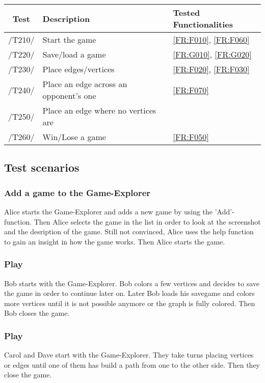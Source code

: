 \begin{tabular}{cll}

\hline
\textbf{Test} & \textbf{Description} & \textbf{Tested Functionalities} \\
\hline
/T210/ & Start the game & \ref{FR:F010}, \ref{FR:F060} \\
/T220/ & Save/load a game & \ref{FR:G010}, \ref{FR:G020} \\
/T230/ & Place edges/vertices & \ref{FR:F020}, \ref{FR:F030} \\
/T240/ & Place an edge across an opponent's one & \ref{FR:F070} \\
/T250/ & Place an edge where no vertices are & \\
/T260/ & Win/Lose a game & \ref{FR:F050} \\
\hline

\end{tabular}

\subsection{Test scenarios}

\subsubsection{Add a game to the Game-Explorer}

Alice starts the Game-Explorer and adds a new game by using the 'Add'-function. Then Alice selects the game in the list in order to look at the screenshot and the desription of the game. Still not convinced, Alice uses the help function to gain an insight in how the game works. Then Alice starts the game.

\subsubsection{Play \graphcoloring}

Bob starts {\graphcoloring} with the Game-Explorer. Bob colors a few vertices and decides to save the game in order to continue later on. Later Bob loads his savegame and colors more vertices until it is not possible anymore or the graph is fully colored. Then Bob closes the game.

\subsubsection{Play \twixt}

Carol and Dave start {\twixt} with the Game-Explorer. They take turns placing vertices or edges until one of them has build a path from one to the other side. Then they close the game.
